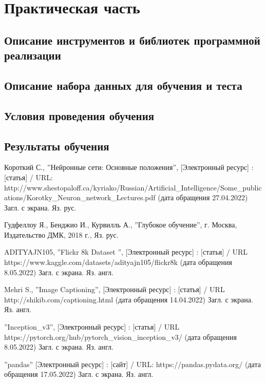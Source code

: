 \documentclass[bachelor, och, coursework]{SCWorks}
\begin{document}
\section{Практическая часть}

    \subsection{Описание инструментов и библиотек программной реализации}
    \subsection{Описание набора данных для обучения и теста}
    \subsection{Условия проведения обучения}
    \subsection{Результаты обучения}

\conclusion

\begin{thebibliography}{99}
     Короткий С., ''Нейронные сети: Основные положения'',
    [Электронный ресурс] : [статья] / URL:
    http://www.shestopaloff.ca/kyriako/Russian/Artificial_Intelligence/Some_publications/Korotky_Neuron_network_Lectures.pdf
    (дата обращения 27.04.2022) Загл. с экрана. Яз. рус.
    
     Гудфеллоу Я., Бенджио И., Курвилль А., ''Глубокое обучение'',
    г. Москва, Издательство ДМК, 2018 г., Яз. рус.
    
     ADITYAJN105, ''Flickr 8k Dataset '', [Электронный ресурс]
    : [статья] / URL https://www.kaggle.com/datasets/adityajn105/flickr8k (дата
    обращения 8.05.2022) Загл. с экрана. Яз. англ.


    
     Mehri S., ''Image Captioning'', [Электронный ресурс]
    : [статья] / URL http://shikib.com/captioning.html (дата обращения
    14.04.2022) Загл. с экрана. Яз. англ.

     ''Inception_v3'', [Электронный ресурс] : [статья] / URL
    https://pytorch.org/hub/pytorch_vision_inception_v3/ (дата обращения
    8.05.2022) Загл. с экрана. Яз. англ.

     ''pandas'' [Электронный ресурс] : [сайт] / URL:
    https://pandas.pydata.org/ (дата обращения 17.05.2022) Загл. с экрана. Яз.
    англ.

\end{thebibliography}
\end{document}
